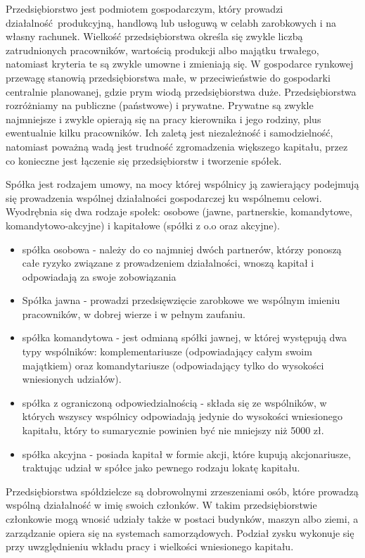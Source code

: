 \documentclass[12pt]{extarticle}
\begin{document}
Przedsiębiorstwo jest podmiotem gospodarczym, który prowadzi działalność produkcyjną, handlową lub usłoguwą w celabh zarobkowych i na własny rachunek. Wielkość przedsiębiorstwa określa się zwykle liczbą zatrudnionych pracowników, wartością produkcji albo majątku trwałego, natomiast kryteria te są zwykle umowne i zmieniają się. W gospodarce rynkowej przewagę stanowią przedsiębiorstwa małe, w przeciwieństwie do gospodarki centralnie planowanej, gdzie prym wiodą przedsiębiorstwa duże. Przedsiębiorstwa rozróżniamy na publiczne (państwowe) i prywatne. Prywatne są zwykle najmniejsze i zwykle opierają się na pracy kierownika i jego rodziny, plus ewentualnie kilku pracowników. Ich zaletą jest niezależność i samodzielność, natomiast poważną wadą jest trudność zgromadzenia większego kapitału, przez co konieczne jest łączenie się przedsiębiorstw i tworzenie spółek.

Spółka jest rodzajem umowy, na mocy której wspólnicy ją zawierający podejmują się prowadzenia wspólnej działalności gospodarczej ku wspólnemu celowi. Wyodrębnia się dwa rodzaje społek: osobowe (jawne, partnerskie, komandytowe, komandytowo-akcyjne) i kapitałowe (spółki z o.o oraz akcyjne).

\begin{itemize}
	\item spółka osobowa - należy do co najmniej dwóch partnerów, którzy ponoszą całe ryzyko związane z prowadzeniem działalności, wnoszą kapitał i odpowiadają za swoje zobowiązania
    \item Spółka jawna - prowadzi przedsięwzięcie zarobkowe we wspólnym imieniu pracowników, w dobrej wierze i w pełnym zaufaniu.
    \item spółka komandytowa - jest odmianą spółki jawnej, w której występują dwa typy wspólników: komplementariusze (odpowiadający całym swoim majątkiem) oraz komandytariusze (odpowiadający tylko do wysokości wniesionych udziałów).
    \item spółka z ograniczoną odpowiedzialnością - składa się ze wspólników, w których wszyscy wspólnicy odpowiadają jedynie do wysokości wniesionego kapitału, który to sumarycznie powinien być nie mniejszy niż 5000 zł.
    \item spółka akcyjna - posiada kapitał w formie akcji, które kupują akcjonariusze, traktując udział w spółce jako pewnego rodzaju lokatę kapitału.
\end{itemize}


Przedsiębiorstwa spółdzielcze są dobrowolnymi zrzeszeniami osób, które prowadzą wspólną działalność w imię swoich członków. W takim przedsiębiorstwie członkowie mogą wnosić udziały także w postaci budynków, maszyn albo ziemi, a zarządzanie opiera się na systemach samorządowych. Podział zysku wykonuje się przy uwzględnieniu wkładu pracy i wielkości wniesionego kapitału.
\end{document}
